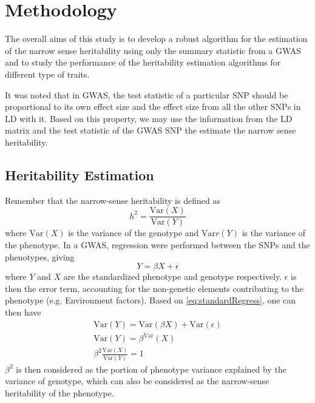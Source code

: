 	\section{Methodology}	
		The overall aims of this study is to develop a robust algorithm for the estimation of the narrow sense heritability using only the summary statistic from a \gls{GWAS} and to study the performance of the heritability estimation algorithms for different type of traits.
		
		It was noted that in \gls{GWAS}, the test statistic of a particular \gls{SNP} should be proportional to its own effect size and the effect size from all the other \glspl{SNP} in \gls{LD} with it.
		Based on this property, we may use the information from the \gls{LD} matrix and the test statistic of the \gls{GWAS} \gls{SNP} the estimate the narrow sense heritability.
		
		
		\subsection{Heritability Estimation}
			Remember that the narrow-sense heritability is defined as 
			$$
				h^2 = \frac{\mathrm{Var}(X)}{\mathrm{Var}(Y)}
			$$
			where $\mathrm{Var}(X)$ is the variance of the genotype and $\mathrm{Var}r(Y)$ is the variance of the phenotype.
			In a \gls{GWAS}, regression were performed between the \glspl{SNP} and the phenotypes, giving
			\begin{equation}
				Y=\beta X+\epsilon
				\label{eq:standardRegress}
			\end{equation}
			where $Y$ and $X$ are the standardized phenotype and genotype respectively. 
			$\epsilon$ is then the error term, accounting for the non-genetic elements contributing to the phenotype (e.g. Environment factors).
			Based on \cref{eq:standardRegress}, one can then have
			\begin{align}
				\mathrm{Var}(Y) = \mathrm{Var}(\beta X)+ \mathrm{Var}(\epsilon) \nonumber\\
				\mathrm{Var}(Y) = \beta^\mathrm{Var}(X) \nonumber\\
				\beta^2\frac{\mathrm{Var}(X)}{\mathrm{Var}(Y)}= 1
				\label{eq:betaHeri}
			\end{align}
			$\beta^2$ is then considered as the portion of phenotype variance explained by the variance of genotype, which can also be considered as the narrow-sense heritability of the phenotype.
					
